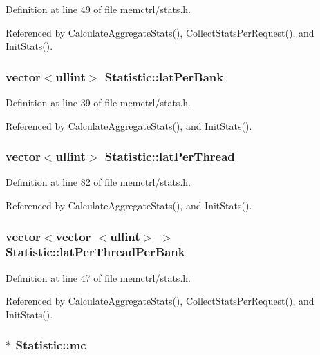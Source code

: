 Definition at line 49 of file memctrl/stats.h.

Referenced by CalculateAggregateStats(), CollectStatsPerRequest(), and InitStats().
\subsubsection[{latPerBank}]{\setlength{\rightskip}{0pt plus 5cm}vector$<${\bf ullint}$>$ {\bf Statistic::latPerBank}}\label{classStatistic_19310045f2591527a15359b862d4316d}




Definition at line 39 of file memctrl/stats.h.

Referenced by CalculateAggregateStats(), and InitStats().
\subsubsection[{latPerThread}]{\setlength{\rightskip}{0pt plus 5cm}vector$<${\bf ullint}$>$ {\bf Statistic::latPerThread}}\label{classStatistic_35b768d43b96e6b76502e29e5f393623}




Definition at line 82 of file memctrl/stats.h.

Referenced by CalculateAggregateStats(), and InitStats().
\subsubsection[{latPerThreadPerBank}]{\setlength{\rightskip}{0pt plus 5cm}vector$<$vector $<${\bf ullint}$>$ $>$ {\bf Statistic::latPerThreadPerBank}}\label{classStatistic_61e55e25bff7b8447f5c9b99ea765cb1}




Definition at line 47 of file memctrl/stats.h.

Referenced by CalculateAggregateStats(), CollectStatsPerRequest(), and InitStats().
\subsubsection[{mc}]{$\ast$ {\bf Statistic::mc}}\label{classStatistic_4a1cfa3c115cc8f30c517cfa7590f671}




